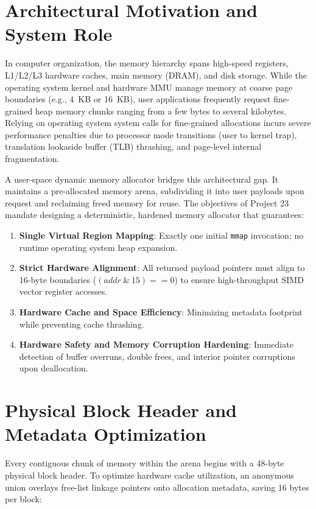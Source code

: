 \documentclass[a4paper,11pt]{report}
\begin{document}
\section{Architectural Motivation and System Role}
In computer organization, the memory hierarchy spans high-speed registers, L1/L2/L3 hardware caches, main memory (DRAM), and disk storage. While the operating system kernel and hardware MMU manage memory at coarse page boundaries (e.g., 4~KB or 16~KB), user applications frequently request fine-grained heap memory chunks ranging from a few bytes to several kilobytes. Relying on operating system system calls for fine-grained allocations incurs severe performance penalties due to processor mode transitions (user to kernel trap), translation lookaside buffer (TLB) thrashing, and page-level internal fragmentation.

A user-space dynamic memory allocator bridges this architectural gap. It maintains a pre-allocated memory arena, subdividing it into user payloads upon request and reclaiming freed memory for reuse. The objectives of Project 23 mandate designing a deterministic, hardened memory allocator that guarantees:
\begin{enumerate}
    \item \textbf{Single Virtual Region Mapping}: Exactly one initial \texttt{mmap} invocation; no runtime operating system heap expansion.
    \item \textbf{Strict Hardware Alignment}: All returned payload pointers must align to 16-byte boundaries ($(addr \ \& \ 15) == 0$) to ensure high-throughput SIMD vector register accesses.
    \item \textbf{Hardware Cache and Space Efficiency}: Minimizing metadata footprint while preventing cache thrashing.
    \item \textbf{Hardware Safety and Memory Corruption Hardening}: Immediate detection of buffer overruns, double frees, and interior pointer corruptions upon deallocation.
\end{enumerate}

\section{Physical Block Header and Metadata Optimization}
Every contiguous chunk of memory within the arena begins with a 48-byte physical block header. To optimize hardware cache utilization, an anonymous union overlays free-list linkage pointers onto allocation metadata, saving 16 bytes per block:
\end{document}
